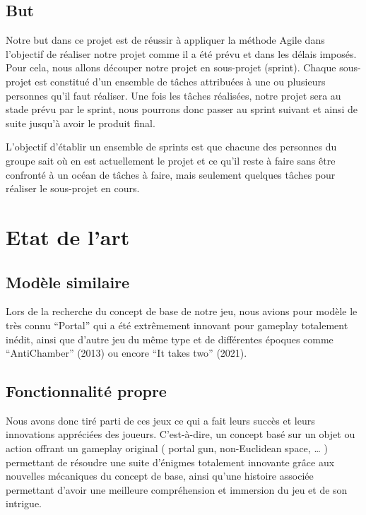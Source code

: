 \documentclass[a4paper,11pt]{article}
\begin{document}
\subsection{But}

Notre but dans ce projet est de réussir à appliquer la méthode Agile dans l’objectif 
de réaliser notre projet comme il a été prévu et dans les délais imposés.
Pour cela, nous allons découper notre projet en sous-projet (sprint).
Chaque sous-projet est constitué d’un ensemble de tâches attribuées à une ou plusieurs 
personnes qu’il faut réaliser. Une fois les tâches réalisées, notre projet sera au stade 
prévu par le sprint, nous pourrons donc passer au sprint suivant et ainsi de suite jusqu’à avoir le produit final.\newline

L'objectif d’établir un ensemble de sprints est que chacune des personnes du groupe sait 
où en est actuellement le projet et ce qu’il reste à faire sans être confronté à un océan de 
tâches à faire, mais seulement quelques tâches pour réaliser le sous-projet en cours.


\section{Etat de l’art}

\subsection{Modèle similaire}

Lors de la recherche du concept de base de notre jeu, nous avions pour modèle le très connu “Portal” 
qui a été extrêmement innovant pour gameplay totalement inédit, ainsi que d’autre jeu du même type et 
de différentes époques comme “AntiChamber” (2013) ou encore “It takes two” (2021). 

\subsection{Fonctionnalité propre}

Nous avons donc tiré parti de ces jeux ce qui a fait leurs succès et leurs innovations appréciées des joueurs. C’est-à-dire, 
un concept basé sur un objet ou action offrant un gameplay original ( portal gun, non-Euclidean space, … ) permettant de résoudre 
une suite d'énigmes totalement innovante grâce aux nouvelles mécaniques du concept de base, ainsi qu’une 
histoire associée permettant d’avoir une meilleure compréhension et immersion du jeu et de son intrigue.
\end{document}
